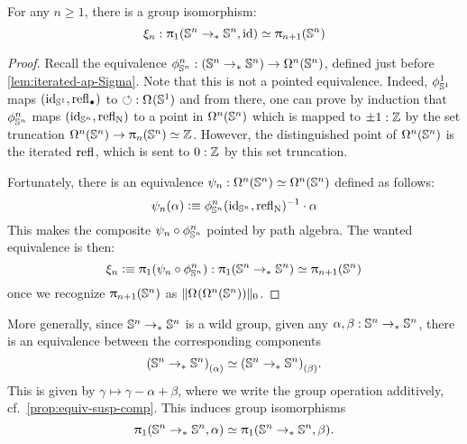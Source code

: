 \documentclass[english,a4paper]{lmcs}
\begin{document}
\begin{lem}\label{lem:fgr-ptd-endomaps-Sn}
  For any $n\geq 1$, there is a group isomorphism:
  \begin{displaymath}
    \xi_n: \uppi_{1}({\mathbb S^{n}} \to_\ast {\mathbb S^{n}}, \mathord{\mathrm{id}}) \simeq \uppi_{n+1} ({\mathbb S^{n}})
  \end{displaymath}
\end{lem}
\begin{proof}
  Recall the equivalence $\phi_{{\mathbb S^{n}}}^n : ({\mathbb S^{n}} \to_\ast {\mathbb S^{n}}) \to \mathop{\Omega^{n}} ({\mathbb S^{n}})$, defined just before \cref{lem:iterated-ap-Sigma}. Note that
  this is not a pointed equivalence. Indeed, $\phi_{{{\mathbb S^{1}}}}^1$ maps $(\id_\Sc,
  \refl\base)$ to $\Sloop: \loopspace\null(\Sc)$ and from there, one can prove by
  induction that $\phi_{{\mathbb S^{n}}}^n$ maps $(\mathord{\mathrm{id}}_{{\mathbb S^{n}}}, \mathop{{\mathrm{refl}}_{\mathrm{N}}})$ to a point in
  $\mathop{\Omega^{n}} ({\mathbb S^{n}})$ which is mapped to $\pm 1:\mathbb{Z}$ by the set truncation
  $\mathop{\Omega^{n}} ({\mathbb S^{n}}) \to \uppi_{n} ({\mathbb S^{n}}) \simeq \mathbb{Z}$. However, the distinguished
  point of $\mathop{\Omega^{n}} ({\mathbb S^{n}})$ is the iterated $\mathop{{\mathrm{refl}}_{}}$, which is sent to
  $0:\mathbb{Z}$ by this set truncation.

  Fortunately, there is an equivalence $\psi_n:\mathop{\Omega^{n}} ({\mathbb S^{n}}) \simeq
  \mathop{\Omega^{n}}({\mathbb S^{n}})$ defined as follows:
  \begin{equation}
    \psi_n (\alpha) \vcentcolon\equiv \phi_{{\mathbb S^{n}}}^n(\mathord{\mathrm{id}}_{{\mathbb S^{n}}},\mathop{{\mathrm{refl}}_{\mathrm{N}}})^{-1}\cdot \alpha
    \label{eq:self-eq-to-refl}
  \end{equation}
  This makes the composite $\psi_n \circ \phi_{{\mathbb S^{n}}}^n$ pointed by path algebra.
  The wanted equivalence is then:
  \begin{equation}
    \xi_n\vcentcolon\equiv \uppi_{1}(\psi_n \circ \phi_{{\mathbb S^{n}}}^n) :
    \uppi_{1}({\mathbb S^{n}} \to_\ast {\mathbb S^{n}}) \simeq \uppi_{n+1} ({\mathbb S^{n}})
    \label{eq:fgr-ptd-endomaps-Sn-defn}
  \end{equation}
  once we recognize $\uppi_{n+1}({\mathbb S^{n}})$ as $\lVert\mathop{\Omega^{}}(\mathop{\Omega^{n}} ({\mathbb S^{n}}))\rVert_0$.
\end{proof}

\begin{rem}
  More generally, since ${\mathbb S^{n}} \to_\ast {\mathbb S^{n}}$ is a wild group,
  given any $\alpha,\beta : {\mathbb S^{n}} \to_\ast {\mathbb S^{n}}$,
  there is an equivalence between the corresponding components
  \[
    {({\mathbb S^{n}} \to_\ast {\mathbb S^{n}})}_{\left(\alpha\right)} \simeq
    {({\mathbb S^{n}} \to_\ast{\mathbb S^{n}})}_{\left(\beta\right)}.
  \]
  This is given by $\gamma \mapsto \gamma - \alpha + \beta$,
  where we write the group operation additively, cf.~\cref{prop:equiv-susp-comp}.
  This induces group isomorphisms
  \[
    \uppi_{1}({\mathbb S^{n}} \to_\ast {\mathbb S^{n}}, \alpha) \simeq
    \uppi_{1}({\mathbb S^{n}} \to_\ast {\mathbb S^{n}}, \beta).
  \]
\end{rem}
\end{document}
